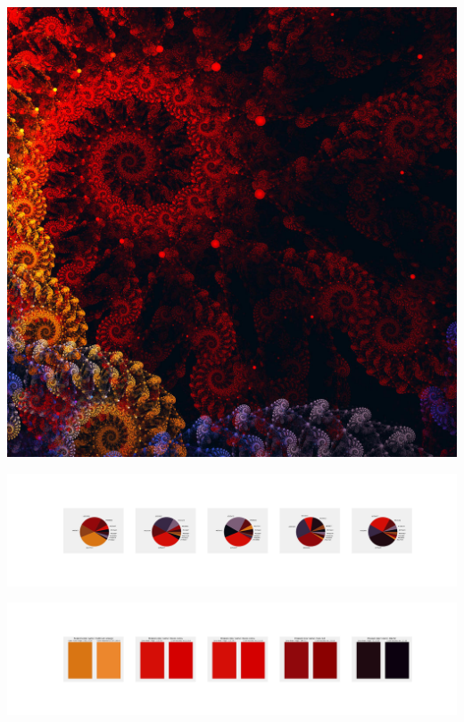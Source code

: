 \documentclass[11pt]{article}
\begin{document}
\begin{landscape}
    \begin{center}
    \includegraphics[width=\textwidth]{./nbimg/file (195).jpg}
    \end{center}

    \begin{center}
    \includegraphics[width=250mm]{./nbimg/pie-106.jpg}
    \end{center}

    \begin{center}
    \includegraphics[width=250mm]{./nbimg/peak-106.jpg}
    \end{center}
    


\end{landscape}
\end{document}
